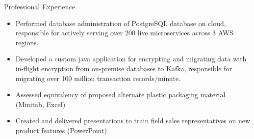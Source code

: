 \documentclass{resume}
\begin{document}
\begin{experienceSection}{Professional Experience}
    \experienceItem[
        company={Stryker Sustainability Solutions},
        location={Tempe, AZ},
        position={Research \& Dev Development Intern},
        duration={May 2019 – Aug 2019}
    ]
    \begin{itemize}
        \itemsep -6pt {}
        \item Performed database administration of PostgreSQL database on cloud, responsible for actively serving over 200 live microservices across 3 AWS regions.
        \item Developed a custom java application for encrypting and migrating data with in-flight encryption from on-premise databases to Kafka, responsible for migrating over 100 million transaction records/minute.
    \end{itemize}

    \experienceItem[
        company={Med Apps},
        location={Scottsdale, AZ},
        position={Quality Engineering Intern},
        duration={May 2018 – Aug 2018}
    ]
    \begin{itemize}
        \itemsep -6pt {}
        \item Assessed equivalency of proposed alternate plastic packaging material (Minitab, Excel)
        \item Created and delivered presentations to train field sales representatives on new product features (PowerPoint)
    \end{itemize}

\end{experienceSection}
\end{document}

